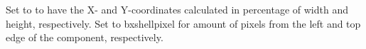    Set to  to have the X- and Y-coordinates
    calculated in percentage of width and height, respectively. Set to
    bxshell{pixel} for amount of pixels from the left and top edge of
    the component, respectively.
